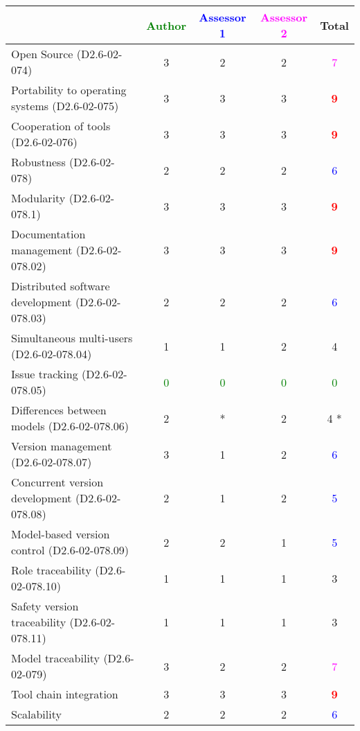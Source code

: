 \begin{tabular}{|l | c | c | c | c|}
\hline
& \textcolor{green}{Author} & \textcolor{blue}{Assessor 1} & \textcolor{magenta}{Assessor 2} & Total \\
\hline 
Open Source (D2.6-02-074) & 3    & 2    & 2    & \textcolor{magenta}{7} \\
\hline 
Portability to operating systems (D2.6-02-075) & 3    & 3    & 3    & \textcolor{red}{\textbf{9}} \\
\hline
Cooperation of tools (D2.6-02-076) & 3    & 3    & 3    & \textcolor{red}{\textbf{9}} \\
\hline
Robustness (D2.6-02-078) & 2    & 2    & 2    & \textcolor{blue}{6} \\
\hline
Modularity (D2.6-02-078.1) & 3    & 3    & 3    & \textcolor{red}{\textbf{9}} \\
\hline
Documentation management (D2.6-02-078.02) & 3    & 3    & 3    & \textcolor{red}{\textbf{9}} \\
\hline
Distributed software development (D2.6-02-078.03)  & 2    & 2    & 2    & \textcolor{blue}{6} \\
\hline
Simultaneous multi-users (D2.6-02-078.04)   & 1    & 1    & 2    & 4    \\
\hline
Issue tracking (D2.6-02-078.05) & \textcolor{green}{0} & \textcolor{green}{0} & \textcolor{green}{0} & \textcolor{green}{0} \\
\hline
Differences between models (D2.6-02-078.06) & 2    & * & 2    & 4   * \\
\hline
Version management (D2.6-02-078.07) & 3    & 1    & 2    & \textcolor{blue}{6} \\
\hline
Concurrent version development (D2.6-02-078.08) & 2    & 1    & 2    & \textcolor{blue}{5} \\
\hline
Model-based version control (D2.6-02-078.09) & 2    & 2    & 1    & \textcolor{blue}{5} \\
\hline
Role traceability (D2.6-02-078.10) & 1    & 1    & 1    & 3    \\
\hline
Safety version traceability (D2.6-02-078.11) & 1    & 1    & 1    & 3    \\
\hline
Model traceability (D2.6-02-079) & 3    & 2    & 2    & \textcolor{magenta}{7} \\
\hline
Tool chain integration & 3    & 3    & 3    & \textcolor{red}{\textbf{9}} \\
\hline
Scalability & 2    & 2    & 2    & \textcolor{blue}{6} \\
\hline
\end{tabular}

